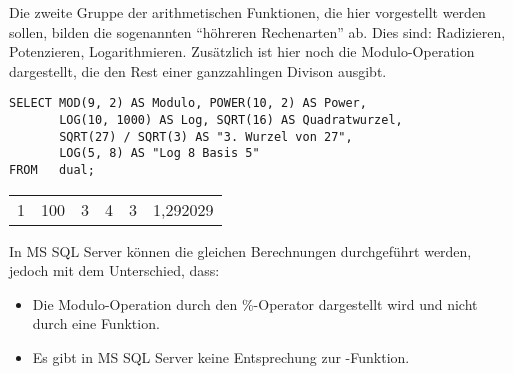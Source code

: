         Die zweite Gruppe der arithmetischen Funktionen, die hier vorgestellt
        werden sollen, bilden die sogenannten \enquote{h\"ohreren Rechenarten}
        ab. Dies sind: Radizieren, Potenzieren, Logarithmieren. Zus\"atzlich ist
        hier noch die Modulo-Operation dargestellt, die den Rest einer
        ganzzahlingen Divison ausgibt.
        \begin{lstlisting}[language=oracle_sql,caption={H\"ohere Rechenarten in Oracle},label=sql03_17]
SELECT MOD(9, 2) AS Modulo, POWER(10, 2) AS Power,
       LOG(10, 1000) AS Log, SQRT(16) AS Quadratwurzel,
       SQRT(27) / SQRT(3) AS "3. Wurzel von 27",
       LOG(5, 8) AS "Log 8 Basis 5"
FROM   dual;
        \end{lstlisting}
        \begin{center}
          \begin{small}
            \tablehead{}
            \begin{oraclesql}
              \begin{supertabular}{rrrrrr}
                1 & 100 & 3 & 4 & 3 & 1,292029 \\
              \end{supertabular}
            \end{oraclesql}
          \end{small}
        \end{center}
        In MS SQL Server k\"onnen die gleichen Berechnungen durchgef\"uhrt
        werden, jedoch mit dem Unterschied, dass:
        \begin{itemize}
          \item Die Modulo-Operation durch den \%-Operator dargestellt wird und
          nicht durch eine Funktion.
          \item Es gibt in MS SQL Server keine Entsprechung zur
          -Funktion.
        \end{itemize}
